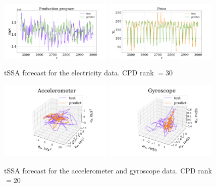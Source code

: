 \documentclass[referee, pdflatex, sn-mathphys-num]{sn-jnl}
\theoremstyle{definition}
\theoremstyle{plain}
\begin{document}
	\begin{figure}[h]
		\centering
		\includegraphics[width=0.48\textwidth, keepaspectratio]{Production_program_pred.png}
		\includegraphics[width=0.48\textwidth, keepaspectratio]{Price_pred.png}
		\caption{tSSA forecast for the electricity data. CPD rank $ = 30 $}\label{fig:electr_pred_tssa}
	\end{figure}
	
	\begin{figure}[h]
		\centering
		\includegraphics[width=0.48\textwidth, 	keepaspectratio]{acceler_pred.png}
		\includegraphics[width=0.48\textwidth, keepaspectratio]{gyro_pred.png}
		\caption{tSSA forecast for the accelerometer and gyroscope data. CPD rank $ = 20 $}\label{fig:accel_gyro_pred_tssa}
	\end{figure}
	
\end{document}
